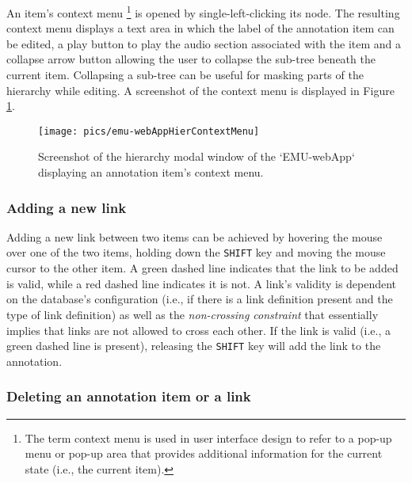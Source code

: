 \documentclass[
]{book}
\begin{document}
An item's context menu \footnote{The term context menu is used in user interface design to refer to a pop-up menu or pop-up area that provides additional information for the current state (i.e., the current item).} is opened by single-left-clicking its node. The resulting context menu displays a text area in which the label of the annotation item can be edited, a play button to play the audio section associated with the item and a collapse arrow button allowing the user to collapse the sub-tree beneath the current item. Collapsing a sub-tree can be useful for masking parts of the hierarchy while editing. A screenshot of the context menu is displayed in Figure \ref{fig:webApp-hierContextMenu}.

\begin{figure}

{\centering \texttt{[image: pics/emu-webAppHierContextMenu]} 

}

\caption{Screenshot of the hierarchy modal window of the `EMU-webApp` displaying an annotation item's context menu.}\label{fig:webApp-hierContextMenu}
\end{figure}

\hypertarget{adding-a-new-link}{%
\subsubsection*{Adding a new link}\label{adding-a-new-link}}

Adding a new link between two items can be achieved by hovering the mouse over one of the two items, holding down the \texttt{SHIFT} key and moving the mouse cursor to the other item. A green dashed line indicates that the link to be added is valid, while a red dashed line indicates it is not. A link's validity is dependent on the database's configuration (i.e., if there is a link definition present and the type of link definition) as well as the \emph{non-crossing constraint} \citep{coleman:lp1991a} that essentially implies that links are not allowed to cross each other. If the link is valid (i.e., a green dashed line is present), releasing the \texttt{SHIFT} key will add the link to the annotation.

\hypertarget{deleting-an-annotation-item-or-a-link}{%
\subsubsection*{Deleting an annotation item or a link}\label{deleting-an-annotation-item-or-a-link}}
\end{document}
